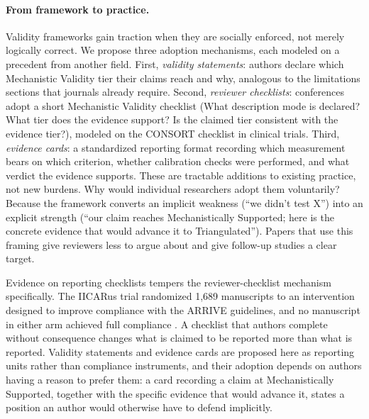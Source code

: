 \documentclass{article}
\begin{document}
\paragraph{From framework to practice.}
Validity frameworks gain traction when they are socially enforced, not merely logically correct. We propose three adoption mechanisms, each modeled on a precedent from another field. First, \emph{validity statements}: authors declare which Mechanistic Validity tier their claims reach and why, analogous to the limitations sections that journals already require. Second, \emph{reviewer checklists}: conferences adopt a short Mechanistic Validity checklist (What description mode is declared? What tier does the evidence support? Is the claimed tier consistent with the evidence tier?), modeled on the CONSORT checklist in clinical trials. Third, \emph{evidence cards}: a standardized reporting format recording which measurement bears on which criterion, whether calibration checks were performed, and what verdict the evidence supports. These are tractable additions to existing practice, not new burdens. Why would individual researchers adopt them voluntarily? Because the framework converts an implicit weakness (``we didn't test X'') into an explicit strength (``our claim reaches Mechanistically Supported; here is the concrete evidence that would advance it to Triangulated''). Papers that use this framing give reviewers less to argue about and give follow-up studies a clear target.

Evidence on reporting checklists tempers the reviewer-checklist mechanism specifically. The IICARus trial randomized 1{,}689 manuscripts to an intervention designed to improve compliance with the ARRIVE guidelines, and no manuscript in either arm achieved full compliance \citep{hair2019randomised}. A checklist that authors complete without consequence changes what is claimed to be reported more than what is reported. Validity statements and evidence cards are proposed here as reporting units rather than compliance instruments, and their adoption depends on authors having a reason to prefer them: a card recording a claim at Mechanistically Supported, together with the specific evidence that would advance it, states a position an author would otherwise have to defend implicitly.
\end{document}
